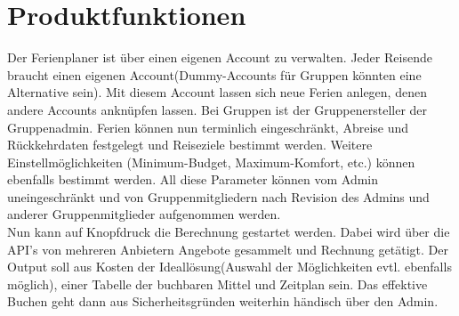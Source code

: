 \documentclass[10pt,a4paper,titlepage,twoside,german]{zhawreprt}
\begin{document}
\chapter{Produktfunktionen}\label{chp:ProductFunctions}
Der Ferienplaner ist über einen eigenen Account zu verwalten. Jeder Reisende braucht einen eigenen Account(Dummy-Accounts für Gruppen könnten eine Alternative sein). Mit diesem Account lassen sich neue Ferien anlegen, denen andere Accounts anknüpfen lassen. Bei Gruppen ist der Gruppenersteller der Gruppenadmin. Ferien können nun terminlich eingeschränkt, Abreise und Rückkehrdaten festgelegt und Reiseziele bestimmt werden. Weitere Einstellmöglichkeiten (Minimum-Budget, Maximum-Komfort, etc.) können ebenfalls bestimmt werden. All diese Parameter können vom Admin uneingeschränkt und von Gruppenmitgliedern nach Revision des Admins und anderer Gruppenmitglieder aufgenommen werden.\\
Nun kann auf Knopfdruck die Berechnung gestartet werden. Dabei wird über die API's von mehreren Anbietern Angebote gesammelt und Rechnung getätigt. Der Output soll aus Kosten der Ideallösung(Auswahl der Möglichkeiten evtl. ebenfalls möglich), einer Tabelle der buchbaren Mittel und Zeitplan sein. Das effektive Buchen geht dann aus Sicherheitsgründen weiterhin händisch über den Admin.
\end{document}
